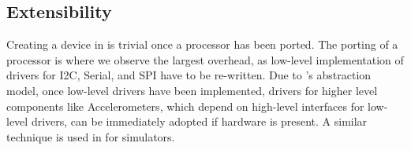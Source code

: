\subsection{Extensibility}

Creating a device in \CO is trivial once a processor has been ported. The porting of a processor is where we observe the largest overhead, as low-level implementation of drivers for I2C, Serial, and SPI have to be re-written. Due to \CON's abstraction model, once low-level drivers have been implemented, drivers for higher level components like Accelerometers, which depend on high-level interfaces for low-level drivers, can be immediately adopted if hardware is present. A similar technique is used in \MC for simulators.






